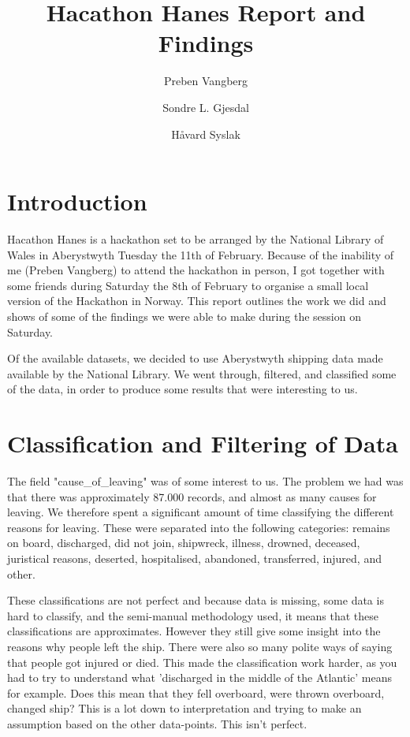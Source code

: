 \documentclass{article}
\author[1,3]{Preben Vangberg}
\author[2]{Sondre L. Gjesdal}
\author[3]{Håvard Syslak}
\affil[1]{Department of Computer Science, Aberystwyth University, Wales}
\affil[2]{Western Norway University of Applied Sciences, Norway}
\affil[3]{MMP PM MON MAIN AUT, Equinor ASA, Norway}
\title{Hacathon Hanes Report and Findings}
\begin{document}
\maketitle
\newpage

\section{Introduction}

Hacathon Hanes is a hackathon set to be arranged by the National Library of Wales in Aberystwyth Tuesday the 11th of February.
Because of the inability of me (Preben Vangberg) to attend the hackathon in person, I got together with some friends during Saturday the 8th of February to organise a small local version of the Hackathon in Norway.
This report outlines the work we did and shows of some of the findings we were able to make during the session on Saturday.

Of the available datasets, we decided to use Aberystwyth shipping data made available by the National Library.
We went through, filtered, and classified some of the data, in order to produce some results that were interesting to us.

\section{Classification and Filtering of Data}

The field "cause\_of\_leaving" was of some interest to us. The problem we had was that there was approximately 87.000 records, and almost as many causes for leaving. 
We therefore spent a significant amount of time classifying the different reasons for leaving.
These were separated into the following categories: remains on board, discharged, did not join, shipwreck, illness, drowned, deceased, juristical reasons, deserted, hospitalised, abandoned, transferred, injured, and other. 

These classifications are not perfect and because data is missing, some data is hard to classify, and the semi-manual methodology used, it means that these classifications are approximates. However they still give some insight into the reasons why people left the ship.
There were also so many polite ways of saying that people got injured or died.
This made the classification work harder, as you had to try to understand what 'discharged in the middle of the Atlantic' means for example.
Does this mean that they fell overboard, were thrown overboard, changed ship? This is a lot down to interpretation and trying to make an assumption based on the other data-points. This isn't perfect.
\end{document}
